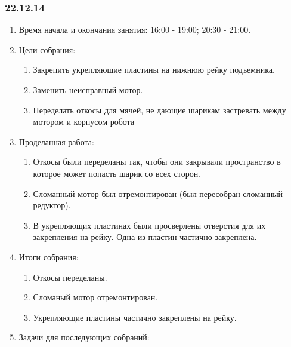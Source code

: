 \subsubsection{22.12.14}
\begin{enumerate}
	
	\item Время начала и окончания занятия: 16:00 - 19:00; 20:30 - 21:00.
	
	\item Цели собрания:
	\begin{enumerate}
		
		\item Закрепить укрепляющие пластины на нижнюю рейку подъемника.
		
		\item Заменить неисправный мотор.
		
		\item Переделать откосы для мячей, не дающие шарикам застревать между мотором и корпусом робота
	\end{enumerate}
	
	\item Проделанная работа:
	\begin{enumerate}
		
		\item Откосы были переделаны так, чтобы они закрывали пространство в которое может попасть шарик со всех сторон.
		
		\item Сломанный мотор был отремонтирован (был пересобран сломанный редуктор).
		
		\item В укрепляющих пластинах были просверлены отверстия для их закрепления на рейку. Одна из пластин частично закреплена.
		
	\end{enumerate}
	
	\item Итоги собрания:
	\begin{enumerate}
		
		\item Откосы переделаны.
		
		\item Сломаный мотор отремонтирован.
		
		\item Укрепляющие пластины частично закреплены на рейку.
		
	\end{enumerate}
	
	\item Задачи для последующих собраний:
	\begin{enumerate}
		

\end{enumerate}
\end{enumerate}
